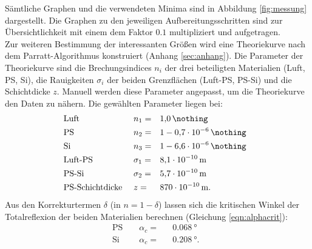 Sämtliche Graphen und die verwendeten Minima sind in Abbildung \ref{fig:messung} dargestellt.
Die Graphen zu den jeweiligen Aufbereitungsschritten sind zur Übersichtlichkeit mit einem dem Faktor $0.1$ multipliziert und aufgetragen.\\
Zur weiteren Bestimmung der interessanten Größen wird eine Theoriekurve nach dem Parratt-Algorithmus konstruiert (Anhang \ref{sec:anhang}).
Die Parameter der Theoriekurve sind die Brechungsindices $n_i$ der drei beteiligten Materialien (Luft, PS, Si), die Rauigkeiten $\sigma_i$ der beiden Grenzflächen (Luft-PS, PS-Si) und die Schichtdicke $z$.
Manuell werden diese Parameter angepasst, um die Theoriekurve den Daten zu nähern.
Die gewählten Parameter liegen bei:
\begin{align*}
	& \text{ Luft }   			  && n_1      	= && \SI{1.0}{\nothing}			    &&  \\
	& \text{ PS }   			  && n_2      	= && 1 -\SI{0.7e-06}{\nothing}	    &&  \\
	& \text{ Si }  		 		  && n_3      	= && 1 -\SI{6.6e-06}{\nothing}	    &&  \\
	& \text{ Luft-PS }   		  && \sigma_1 	= && \SI{8.1e-10}{m}				&&  \\
	& \text{ PS-Si }   			  && \sigma_2 	= && \SI{5.7e-10}{m}				&&  \\
	& \text{ PS-Schichtdicke }    && z 			= && \SI{870e-10}{m}.				&&  \\
\end{align*}
Aus den Korrekturtermen $\delta$ (in $n = 1 - \delta$) lassen sich die kritischen Winkel der Totalreflexion der beiden Materialien berechnen (Gleichung \eqref{eqn:alphacrit}):
\begin{align}
	& \text{ PS }	&& \alpha_c = && \SI{0.068}{°} 	    && \\
	& \text{ Si }	&& \alpha_c = && \SI{0.208}{°}. 	&& \\
\end{align}



